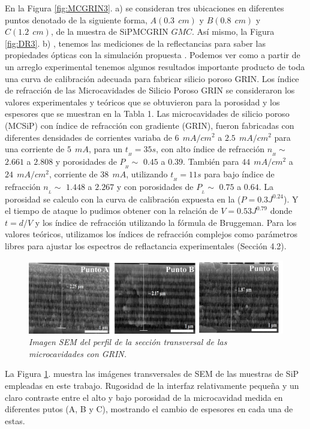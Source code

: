 \documentclass[a4paper,11pt,]{book}
\begin{document}
En la  Figura \ref{fig:MCGRIN3}. a) se consideran tres ubicaciones en diferentes puntos denotado de la siguiente forma,  $A(0.3\ \ cm)$ y $ B(0.8 \ \  cm)$ y $ C(1.2 \ \  cm)$, de la  muestra de SiPMCGRIN $GMC$. Así mismo, la Figura \ref{fig:DR3}. b) , tenemos las mediciones de la reflectancias para saber las propiedades ópticas con la simulación propuesta . Podemos ver como a partir de un arreglo experimental tenemos algunos resultados importante producto de toda una curva de calibración adecuada para fabricar silicio poroso GRIN.  Los índice de refracción de las Microcavidades  de Silicio Poroso GRIN se consideraron los valores experimentales y teóricos que se obtuvieron para la porosidad y los espesores que se muestran en la Tabla 1.  Las microcavidades de silicio poroso (MCSiP) con índice de refracción con gradiente (GRIN), fueron fabricadas con diferentes densidades de corrientes variaba de $6 \ \ mA/cm^2$ a $2.5 \ \ mA/cm^2$ para una corriente de $5 \ \  mA$, para un  $t_{_{H}}=35 s  $, con alto índice de refracción $n_{_{H}} \sim$  $2.661$ a $2.808$  y  porosidades de $P_{_{H}} \sim$ $0.45$ a $0.39$. También para  $44\ \ mA/cm^2$ a $24\ \  mA/cm^2$, corriente de $38 \ \  mA$, utilizando $t_{_{H}}=11 s$ para bajo índice de refracción $n_{_{L}}\sim$  $1.448$ a $2.267$ y con porosidades de $P_{_{L}} \sim$ $  0.75 $ a $ 0.64 $. La porosidad se calculo con la curva de calibración expuesta en la   ($P=0.3J^{0.24}$). Y el tiempo de ataque lo pudimos obtener con la relación de $V=0.53J^{0.79}$ donde $t=d/V$  y los índice de refracción utilizando la fórmula de Bruggeman. Para los valores teóricos, utilizamos los índices de refracción complejos como parámetros libres para ajustar los espectros de reflactancia experimentales (Sección 4.2). 
\begin{figure}[H]
	\centering
	\includegraphics[scale=.3]{../Images/MCGRINSEM}
	\caption{\emph{Imagen SEM del perfil de la sección transversal de las microcavidades con GRIN.}}
	\label{fig:MCGRIN4}
\end{figure}
La Figura \ref{fig:MCGRIN4}. muestra las imágenes transversales de SEM de las muestras de SiP empleadas en este trabajo. Rugosidad de la interfaz relativamente pequeña y un claro contraste entre el alto y bajo porosidad  de la microcavidad medida en diferentes putos (A, B y C), mostrando el cambio de espesores en cada una de estas. 
\end{document}
